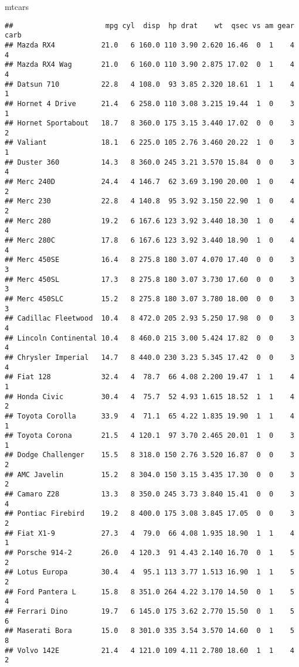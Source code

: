 \documentclass[
]{book}
\newenvironment{Shaded}{\begin{snugshade}}{\end{snugshade}}
\newcommand{\NormalTok}[1]{#1}
\begin{document}
\begin{Shaded}
\begin{Highlighting}[]
\NormalTok{mtcars}
\end{Highlighting}
\end{Shaded}

\begin{verbatim}
##                      mpg cyl  disp  hp drat    wt  qsec vs am gear carb
## Mazda RX4           21.0   6 160.0 110 3.90 2.620 16.46  0  1    4    4
## Mazda RX4 Wag       21.0   6 160.0 110 3.90 2.875 17.02  0  1    4    4
## Datsun 710          22.8   4 108.0  93 3.85 2.320 18.61  1  1    4    1
## Hornet 4 Drive      21.4   6 258.0 110 3.08 3.215 19.44  1  0    3    1
## Hornet Sportabout   18.7   8 360.0 175 3.15 3.440 17.02  0  0    3    2
## Valiant             18.1   6 225.0 105 2.76 3.460 20.22  1  0    3    1
## Duster 360          14.3   8 360.0 245 3.21 3.570 15.84  0  0    3    4
## Merc 240D           24.4   4 146.7  62 3.69 3.190 20.00  1  0    4    2
## Merc 230            22.8   4 140.8  95 3.92 3.150 22.90  1  0    4    2
## Merc 280            19.2   6 167.6 123 3.92 3.440 18.30  1  0    4    4
## Merc 280C           17.8   6 167.6 123 3.92 3.440 18.90  1  0    4    4
## Merc 450SE          16.4   8 275.8 180 3.07 4.070 17.40  0  0    3    3
## Merc 450SL          17.3   8 275.8 180 3.07 3.730 17.60  0  0    3    3
## Merc 450SLC         15.2   8 275.8 180 3.07 3.780 18.00  0  0    3    3
## Cadillac Fleetwood  10.4   8 472.0 205 2.93 5.250 17.98  0  0    3    4
## Lincoln Continental 10.4   8 460.0 215 3.00 5.424 17.82  0  0    3    4
## Chrysler Imperial   14.7   8 440.0 230 3.23 5.345 17.42  0  0    3    4
## Fiat 128            32.4   4  78.7  66 4.08 2.200 19.47  1  1    4    1
## Honda Civic         30.4   4  75.7  52 4.93 1.615 18.52  1  1    4    2
## Toyota Corolla      33.9   4  71.1  65 4.22 1.835 19.90  1  1    4    1
## Toyota Corona       21.5   4 120.1  97 3.70 2.465 20.01  1  0    3    1
## Dodge Challenger    15.5   8 318.0 150 2.76 3.520 16.87  0  0    3    2
## AMC Javelin         15.2   8 304.0 150 3.15 3.435 17.30  0  0    3    2
## Camaro Z28          13.3   8 350.0 245 3.73 3.840 15.41  0  0    3    4
## Pontiac Firebird    19.2   8 400.0 175 3.08 3.845 17.05  0  0    3    2
## Fiat X1-9           27.3   4  79.0  66 4.08 1.935 18.90  1  1    4    1
## Porsche 914-2       26.0   4 120.3  91 4.43 2.140 16.70  0  1    5    2
## Lotus Europa        30.4   4  95.1 113 3.77 1.513 16.90  1  1    5    2
## Ford Pantera L      15.8   8 351.0 264 4.22 3.170 14.50  0  1    5    4
## Ferrari Dino        19.7   6 145.0 175 3.62 2.770 15.50  0  1    5    6
## Maserati Bora       15.0   8 301.0 335 3.54 3.570 14.60  0  1    5    8
## Volvo 142E          21.4   4 121.0 109 4.11 2.780 18.60  1  1    4    2
\end{verbatim}
\end{document}
